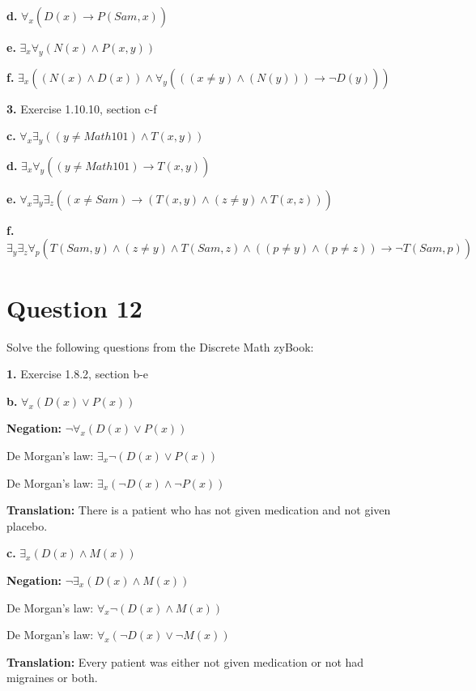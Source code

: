 \documentclass[11pt]{article}
\begin{document}
	\textbf{d.}
	$\forall_x (D(x)\xrightarrow[]{}P(Sam,x))$
	
	\textbf{e.}
	$\exists_x \forall_y (N(x)\wedge P(x,y))$
	
	\textbf{f.}
	$\exists_x((N(x)\wedge D(x))\wedge \forall_y (((x\neq y)\wedge (N(y)))\xrightarrow[]{}\neg D(y)))$
	
	\vspace{3mm}
	\textbf{3.} Exercise 1.10.10, section c-f
	\medskip
	
	\textbf{c.}
	$\forall_x \exists_y ((y\neq Math101)\wedge T(x,y))$
	
	\textbf{d.}
	$\exists_x \forall_y ((y\neq Math101)\xrightarrow[]{}T(x,y))$
	
	\textbf{e.}
	$\forall_x \exists_y \exists_z ((x\neq Sam)\xrightarrow[]{}(T(x,y) \wedge (z\neq y)\wedge T(x,z)))$
	
	\textbf{f.}
	$\exists_y \exists_z \forall_p (T(Sam,y)\wedge (z\neq y)\wedge T(Sam,z)\wedge ((p\neq y)\wedge (p\neq z))\xrightarrow[]{}\neg T(Sam,p))$
	
	\newpage
	\section*{Question 12}
	Solve the following questions from the Discrete Math zyBook:
	
	\textbf{1.} Exercise 1.8.2, section b-e
	\medskip
	
	\textbf{b.}
	$\forall_x (D(x)\vee P(x))$
	
	\textbf{Negation:}
	$\neg \forall_x (D(x)\vee P(x))$
	
	De Morgan's law: $\exists_x \neg (D(x)\vee P(x))$
	
	De Morgan's law: $\exists_x (\neg D(x)\wedge \neg P(x))$
	
	\textbf{Translation:}
	There is a patient who has not given medication and not given placebo.
	\vspace{2mm}
	
	\textbf{c.}
	$\exists_x (D(x)\wedge M(x))$
	
	\textbf{Negation:}
	$\neg \exists_x (D(x)\wedge M(x))$
	
	De Morgan's law: $\forall_x \neg (D(x)\wedge M(x))$
	
	De Morgan's law: $\forall_x (\neg D(x)\vee \neg M(x))$
	
	\textbf{Translation:}
	Every patient was either not given medication or not had migraines or both.
	\vspace{2mm}
	
\end{document}
